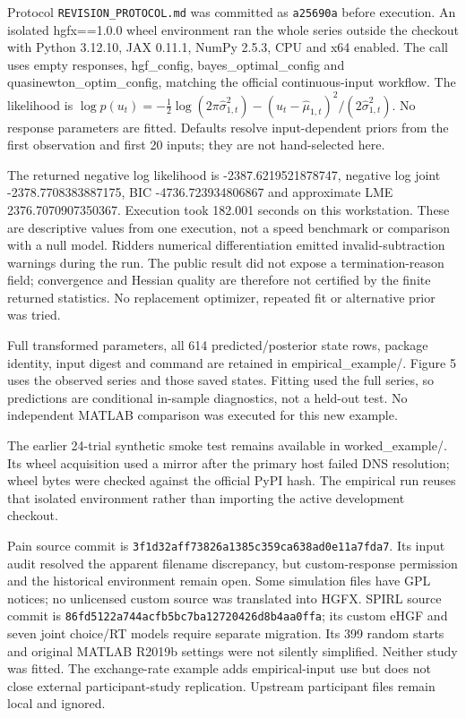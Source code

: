 \documentclass[
  11pt,
]{article}
\begin{document}
Protocol \texttt{REVISION\_PROTOCOL.md} was committed as
\texttt{a25690a} before execution. An isolated hgfx==1.0.0 wheel
environment ran the whole series outside the checkout with Python
3.12.10, JAX 0.11.1, NumPy 2.5.3, CPU and x64 enabled. The call uses
empty responses, hgf\_config, bayes\_optimal\_config and
quasinewton\_optim\_config, matching the official continuous-input
workflow. The likelihood is
\(\log p(u_t)=-\frac12\log(2\pi\hat\sigma_{1,t}^2)
-(u_t-\hat\mu_{1,t})^2/(2\hat\sigma_{1,t}^2)\). No response parameters
are fitted. Defaults resolve input-dependent priors from the first
observation and first 20 inputs; they are not hand-selected here.

The returned negative log likelihood is -2387.6219521878747, negative
log joint -2378.7708383887175, BIC -4736.723934806867 and approximate
LME 2376.7070907350367. Execution took 182.001 seconds on this
workstation. These are descriptive values from one execution, not a
speed benchmark or comparison with a null model. Ridders numerical
differentiation emitted invalid-subtraction warnings during the run. The
public result did not expose a termination-reason field; convergence and
Hessian quality are therefore not certified by the finite returned
statistics. No replacement optimizer, repeated fit or alternative prior
was tried.

Full transformed parameters, all 614 predicted/posterior state rows,
package identity, input digest and command are retained in
empirical\_example/. Figure 5 uses the observed series and those saved
states. Fitting used the full series, so predictions are conditional
in-sample diagnostics, not a held-out test. No independent MATLAB
comparison was executed for this new example.

The earlier 24-trial synthetic smoke test remains available in
worked\_example/. Its wheel acquisition used a mirror after the primary
host failed DNS resolution; wheel bytes were checked against the
official PyPI hash. The empirical run reuses that isolated environment
rather than importing the active development checkout.

Pain source commit is \texttt{3f1d32aff73826a1385c359ca638ad0e11a7fda7}.
Its input audit resolved the apparent filename discrepancy, but
custom-response permission and the historical environment remain open.
Some simulation files have GPL notices; no unlicensed custom source was
translated into HGFX. SPIRL source commit is
\texttt{86fd5122a744acfb5bc7ba12720426d8b4aa0ffa}; its custom eHGF and
seven joint choice/RT models require separate migration. Its 399 random
starts and original MATLAB R2019b settings were not silently simplified.
Neither study was fitted. The exchange-rate example adds empirical-input
use but does not close external participant-study replication. Upstream
participant files remain local and ignored.
\end{document}
